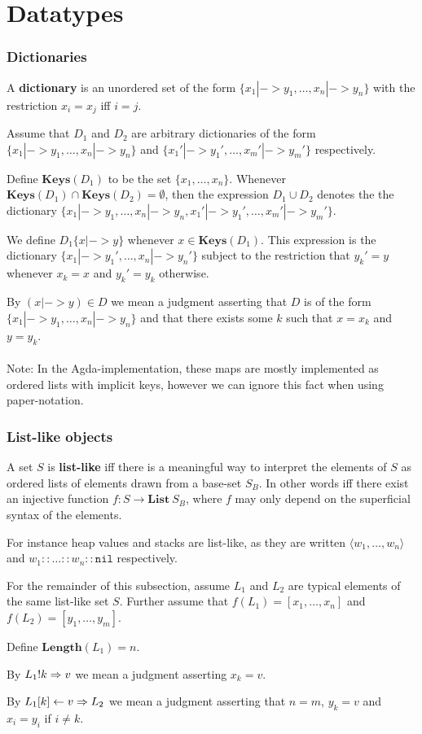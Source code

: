 \section{Datatypes}

\subsubsection{Dictionaries}
A \textbf{dictionary} is an unordered set of the form
$\{x_1 |-> y_1, \dots, x_n |-> y_n\}$ with the restriction $x_i = x_j$ iff
$i = j$.

Assume that $D_1$ and $D_2$ are arbitrary dictionaries of the form
$\{x_1 |-> y_1, \dots, x_n |-> y_n\}$ and
$\{x_1' |-> y_1', \dots, x_m' |-> y_m'\}$ respectively.

Define $\mathbf{Keys}(D_1)$ to be the set $\{x_1, \dots, x_n\}$. Whenever
$\mathbf{Keys}(D_1) \cap \mathbf{Keys}(D_2) = \emptyset$, then the expression
$D_1 \cup D_2$ denotes the the dictionary
$\{x_1 |-> y_1, \dots, x_n |-> y_n, x_1' |-> y_1', \dots, x_m' |-> y_m'\}$.

We define $D_1\{x |-> y\}$ whenever $x \in \mathbf{Keys}(D_1)$. This expression
is the dictionary $\{x_1 |-> y_1', \dots, x_n |-> y_n'\}$ subject to the
restriction that $y_k' = y$ whenever $x_k = x$ and $y_k' = y_k$ otherwise.

By $(x |-> y) \in D$ we mean a judgment asserting that $D$ is of the form
$\{x_1 |-> y_1, \dots, x_n |-> y_n\}$ and that there exists some $k$ such that
$x = x_k$ and $y = y_k$.

\paragraph{}
Note: In the Agda-implementation, these maps are mostly implemented as ordered
lists with implicit keys, however we can ignore this fact when using
paper-notation.

\subsubsection{List-like objects}
A set $S$ is \textbf{list-like} iff there is a meaningful way to interpret the
elements of $S$ as ordered lists of elements drawn from a base-set $S_B$. In
other words iff there exist an injective function
$f : S \to \mathbf{List}\ S_B$, where $f$ may only depend on the superficial
syntax of the elements.

For instance heap values and stacks are list-like, as they are written
$\langle w_1, \dots, w_n \rangle$ and $w_1 :: \dots :: w_n :: \mathtt{nil}$
respectively.

For the remainder of this subsection, assume $L_1$ and $L_2$ are typical
elements of the same list-like set $S$. Further assume that
$f(L_1) = [x_1, \dots, x_n]$ and $f(L_2) = [y_1, \dots, y_m]$.

Define $\mathbf{Length}(L_1) = n$.

By ${L_1} ! {k} => {v}$ we mean a judgment asserting $x_k = v$.

By ${L_1}[{k}] <- {v} => {L_2}$ we mean a judgment asserting that $n=m$, $y_k=v$
and $x_i = y_i$ if $i \neq k$.
